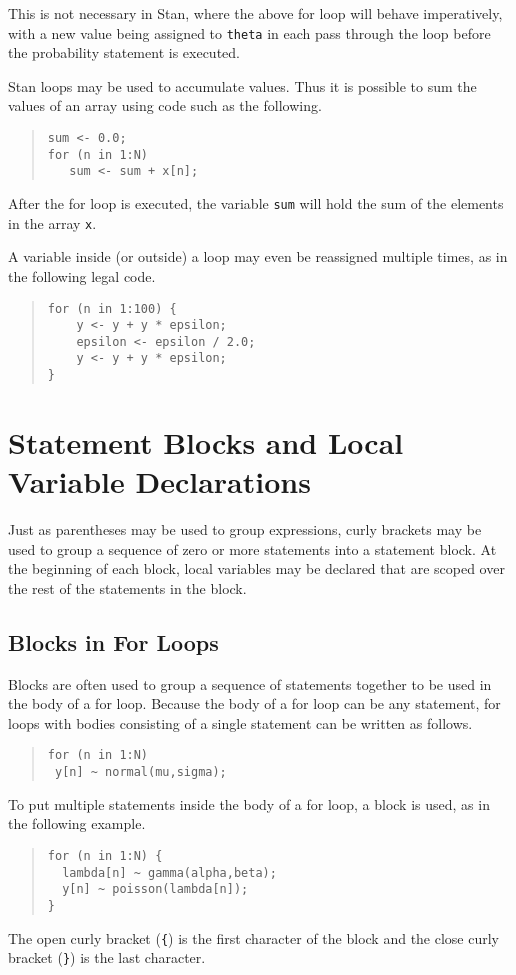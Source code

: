 \documentclass[10pt]{report}
\newcommand{\Stan}{Stan\xspace}
\newcommand{\code}[1]{{\tt #1}}
\begin{document}
This is not necessary in \Stan, where the above for loop will behave
imperatively, with a new value being assigned to \code{theta} in each
pass through the loop before the probability statement is executed.

\Stan loops may be used to accumulate values.  Thus it is possible to
sum the values of an array using code such as the following.
%
\begin{quote}
\begin{Verbatim}
sum <- 0.0;
for (n in 1:N) 
   sum <- sum + x[n];
\end{Verbatim}
\end{quote}
%
After the for loop is executed, the variable \code{sum} will hold the
sum of the elements in the array \code{x}.

A variable inside (or outside) a loop may even be reassigned multiple
times, as in the following legal code.
%
\begin{quote}
\begin{Verbatim}
for (n in 1:100) {
    y <- y + y * epsilon;
    epsilon <- epsilon / 2.0;
    y <- y + y * epsilon;
}
\end{Verbatim}
\end{quote}
%


\section{Statement Blocks and Local Variable Declarations}

Just as parentheses may be used to group expressions, curly brackets
may be used to group a sequence of zero or more statements into a
statement block.  At the beginning of each block, local variables may be
declared that are scoped over the rest of the statements in the block.

\subsection{Blocks in For Loops}

Blocks are often used to group a sequence of statements together to be
used in the body of a for loop.  Because the body of a for loop can be
any statement, for loops with bodies consisting of a single statement
can be written as follows.
%
\begin{quote}
\begin{Verbatim} 
for (n in 1:N) 
 y[n] ~ normal(mu,sigma);
\end{Verbatim}
\end{quote}
% 
To put multiple statements inside the body of a for loop, a block is
used, as in the following example.
%
\begin{quote}
\begin{Verbatim}
for (n in 1:N) {
  lambda[n] ~ gamma(alpha,beta);
  y[n] ~ poisson(lambda[n]);
}
\end{Verbatim}
\end{quote}
%
The open curly bracket (\code{\{}) is the first character of the block
and the close curly bracket (\code{\}}) is the last character.
\end{document}
